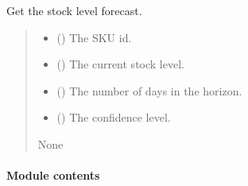 \documentclass[letterpaper,10pt,english]{sphinxmanual}
\begin{document}
\begin{fulllineitems}
\label{\detokenize{src_demand_forecast.inference:src_demand_forecast.inference.make_request.stock_level_forecast}}
\pysigstartsignatures
{}
\pysigstopsignatures
\sphinxAtStartPar
Get the stock level forecast.
\begin{quote}\begin{description}
\begin{itemize}
\item {} 
\sphinxAtStartPar
{} () \textendash{} The SKU id.

\item {} 
\sphinxAtStartPar
{} () \textendash{} The current stock level.

\item {} 
\sphinxAtStartPar
{} () \textendash{} The number of days in the horizon.

\item {} 
\sphinxAtStartPar
{} () \textendash{} The confidence level.

\end{itemize}

\sphinxAtStartPar
None

\end{description}\end{quote}

\end{fulllineitems}



\paragraph{Module contents}
\label{\detokenize{src_demand_forecast.inference:module-src_demand_forecast.inference}}\label{\detokenize{src_demand_forecast.inference:module-contents}}
\sphinxstepscope
\end{document}
